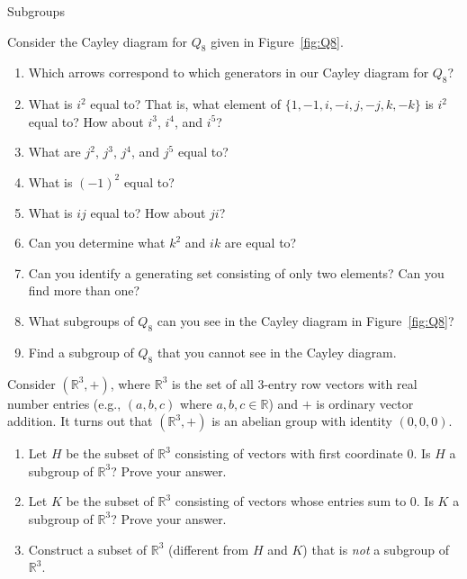 \begin{section}{Subgroups}
\begin{problem}
Consider the Cayley diagram for $Q_8$ given in Figure~\ref{fig:Q8}.
\begin{enumerate}[label=\rm{(\alph*)}]
\item Which arrows correspond to which generators in our Cayley diagram for $Q_8$?
\item What is $i^2$ equal to?  That is, what element of $\{1,-1,i,-i,j,-j,k,-k\}$ is $i^2$ equal to?  How about $i^3$, $i^4$, and $i^5$?
\item What are $j^2$, $j^3$, $j^4$, and $j^5$ equal to?
\item What is $(-1)^2$ equal to?
\item What is $ij$ equal to?  How about $ji$?
\item Can you determine what $k^2$ and $ik$ are equal to?
\item Can you identify a generating set consisting of only two elements?  Can you find more than one?
\item What subgroups of $Q_8$ can you see in the Cayley diagram in Figure~\ref{fig:Q8}?
\item Find a subgroup of $Q_8$ that you cannot see in the Cayley diagram.
\end{enumerate}
\end{problem}

\begin{problem}
Consider $(\mathbb{R}^3,+)$, where $\mathbb{R}^3$ is the set of all 3-entry row vectors with real number entries (e.g., $(a,b,c)$ where $a,b,c\in\mathbb{R}$) and $+$ is ordinary vector addition.  It turns out that $(\mathbb{R}^3,+)$ is an abelian group with identity $(0,0,0)$.  
\begin{enumerate}[label=\rm{(\alph*)}]
\item Let $H$ be the subset of $\mathbb{R}^3$ consisting of vectors with first coordinate 0.  Is $H$ a subgroup of $\mathbb{R}^3$?  Prove your answer.
\item Let $K$ be the subset of $\mathbb{R}^3$ consisting of vectors whose entries sum to 0.  Is $K$ a subgroup of $\mathbb{R}^3$?  Prove your answer.
\item Construct a subset of $\mathbb{R}^3$ (different from $H$ and $K$) that is \emph{not} a subgroup of $\mathbb{R}^3$.
\end{enumerate}
\end{problem}


\end{section}
